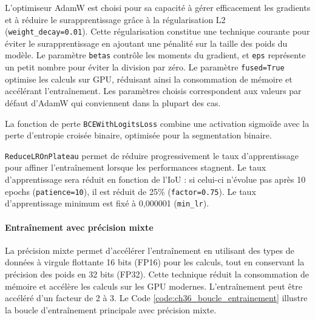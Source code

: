L'optimiseur AdamW \cite{noauthor_adamw_nodate} est choisi pour sa capacité à gérer efficacement les gradients et à réduire le surapprentissage grâce à la régularisation L2 (\texttt{weight\_decay=0.01}). Cette régularisation constitue une technique courante pour éviter le surapprentissage en ajoutant une pénalité sur la taille des poids du modèle. Le paramètre \texttt{betas} contrôle les moments du gradient, et \texttt{eps} représente un petit nombre pour éviter la division par zéro. Le paramètre \texttt{fused=True} optimise les calculs sur GPU, réduisant ainsi la consommation de mémoire et accélérant l'entraînement. Les paramètres choisis correspondent aux valeurs par défaut d'AdamW qui conviennent dans la plupart des cas.

La fonction de perte \texttt{BCEWithLogitsLoss} combine une activation sigmoïde avec la perte d'entropie croisée binaire, optimisée pour la segmentation binaire.

\texttt{ReduceLROnPlateau} permet de réduire progressivement le taux d'apprentissage pour affiner l'entraînement lorsque les performances stagnent. Le taux d'apprentissage sera réduit en fonction de l'IoU : si celui-ci n'évolue pas après 10 epochs (\texttt{patience=10}), il est réduit de 25\% (\texttt{factor=0.75}). Le taux d'apprentissage minimum est fixé à 0,000001 (\texttt{min\_lr}).

\paragraph{Entraînement avec précision mixte}
La précision mixte \cite{noauthor_automatic_nodate} permet d'accélérer l'entraînement en utilisant des types de données à virgule flottante 16 bits (FP16) pour les calculs, tout en conservant la précision des poids en 32 bits (FP32). Cette technique réduit la consommation de mémoire et accélère les calculs sur les GPU modernes. L'entraînement peut être accéléré d'un facteur de 2 à 3. Le Code \ref{code:ch36_boucle_entrainement} illustre la boucle d'entraînement principale avec précision mixte.

